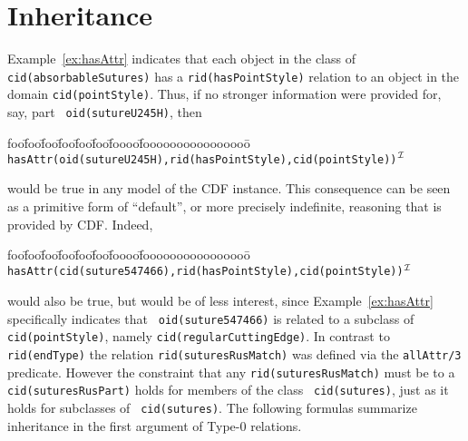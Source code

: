 \section{Inheritance} \label{sec:inheritance}

Example~\ref{ex:hasAttr} indicates that each object in the class of
{\tt cid(absorbableSutures)} has a {\tt rid(hasPointStyle)} relation
to an object in the domain {\tt cid(pointStyle)}.  Thus, if no
stronger information were provided for, say, part {\tt
oid(sutureU245H)}, then
{\small 
\begin{tabbing}
foo\=foo\=foo\=foo\=foo\=foo\=foooo\=foooooooooooooooo\=\kill
\> {\tt hasAttr(oid(sutureU245H),rid(hasPointStyle),cid(pointStyle))}$^{{\cal I}}$
\end{tabbing} } 
\noindent would be true in any model of the CDF instance.  This
consequence can be seen as a primitive form of ``default'', or more
precisely indefinite, reasoning that is provided by CDF.  Indeed,
{\small 
\begin{tabbing}
foo\=foo\=foo\=foo\=foo\=foo\=foooo\=foooooooooooooooo\=\kill
\> {\tt
hasAttr(cid(suture547466),rid(hasPointStyle),cid(pointStyle))$^{{\cal I}}$} 
\end{tabbing} } 
\noindent would also be true, but would be of less interest, since
Example~\ref{ex:hasAttr} specifically indicates that {\tt
oid(suture547466)} is related to a subclass of {\tt cid(pointStyle)},
namely {\tt cid(regularCuttingEdge)}.  In contrast to {\tt
rid(endType)} the relation {\tt rid(suturesRusMatch)} was defined via
the {\tt allAttr/3} predicate.  
However the constraint that any {\tt rid(suturesRusMatch)} must be to
a {\tt cid(suturesRusPart)} holds for members of the class {\tt
cid(sutures)}, just as it holds for subclasses of {\tt
cid(sutures)}. 
The following formulas summarize inheritance in the
first argument of Type-0 relations.



